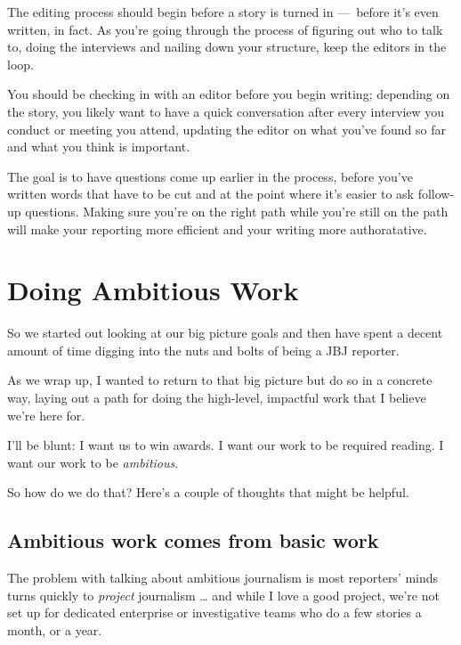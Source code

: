 \documentclass[
  11pt,
  american,
  letterpaperpaper,
  extrafontsizes,onecolumn,openright
  ]{memoir}
\begin{document}
The editing process should begin before a story is turned in ---~before it's even written, in fact. As you're going through the process of figuring out who to talk to, doing the interviews and nailing down your structure, keep the editors in the loop.

You should be checking in with an editor before you begin writing; depending on the story, you likely want to have a quick conversation after every interview you conduct or meeting you attend, updating the editor on what you've found so far and what you think is important.

The goal is to have questions come up earlier in the process, before you've written words that have to be cut and at the point where it's easier to ask follow-up questions. Making sure you're on the right path while you're still on the path will make your reporting more efficient and your writing more authoratative.

\hypertarget{doing-ambitious-work}{%
\chapter{Doing Ambitious Work}\label{doing-ambitious-work}}

So we started out looking at our big picture goals and then have spent a decent amount of time digging into the nuts and bolts of being a JBJ reporter.

As we wrap up, I wanted to return to that big picture but do so in a concrete way, laying out a path for doing the high-level, impactful work that I believe we're here for.

I'll be blunt: I want us to win awards. I want our work to be required reading. I want our work to be \emph{ambitious}.

So how do we do that? Here's a couple of thoughts that might be helpful.

\hypertarget{ambitious-work-comes-from-basic-work}{%
\section*{Ambitious work comes from basic work}\label{ambitious-work-comes-from-basic-work}}

The problem with talking about ambitious journalism is most reporters' minds turns quickly to \emph{project} journalism \ldots{} and while I love a good project, we're not set up for dedicated enterprise or investigative teams who do a few stories a month, or a year.
\end{document}
